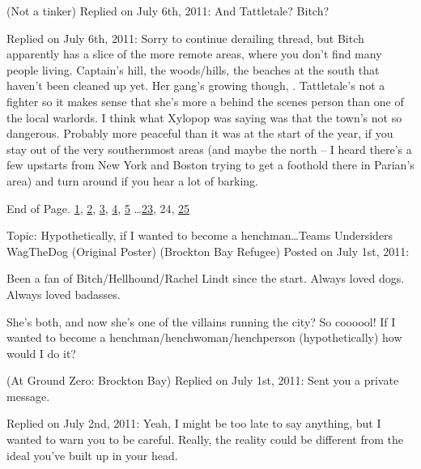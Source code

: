 \blacktriangleright {} (Not a tinker)
Replied on July 6th, 2011:
And Tattletale?  Bitch?



\blacktriangleright {}
Replied on July 6th, 2011:
Sorry to continue derailing thread, but Bitch apparently has a slice of the more remote areas, where you don't find many people living.  Captain's hill, the woods/hills, the beaches at the south that haven't been cleaned up yet.  Her gang's growing though, \underline{}.  Tattletale's not a fighter so it makes sense that she's more a behind the scenes person than one of the local warlords.  I think what Xylopop was saying was that the town's not so dangerous.  Probably more peaceful than it was at the start of the year, if you stay out of the very southernmost areas (and maybe the north – I heard there's a few upstarts from New York and Boston trying to get a foothold there in Parian's area) and turn around if you hear a lot of barking.



End of Page.   \underline{1}, \underline{2}, \underline{3}, \underline{4}, \underline{5} \ldots \underline{23}, 24, \underline{25}



\blacksquare



\blacklozenge  Topic:  Hypothetically, if I wanted to become a henchman\ldots{}\blacktriangleright Teams \blacktriangleright Undersiders
WagTheDog (Original Poster) (Brockton Bay Refugee)
Posted on July 1st, 2011:



Been a fan of Bitch/Hellhound/Rachel Lindt since the start.  Always loved dogs.  Always loved badasses.



She's both, and now she's one of the villains running the city?  So coooool!  If I wanted to become a henchman/henchwoman/henchperson (hypothetically) how would I do it?



\blacktriangleright  {}(At Ground Zero: Brockton Bay)
Replied on July 1st, 2011:
Sent you a private message.



\blacktriangleright  {}
Replied on July 2nd, 2011:
Yeah, I might be too late to say anything, but I wanted to warn you to be careful.  Really, the reality could be different from the ideal you've built up in your head.




